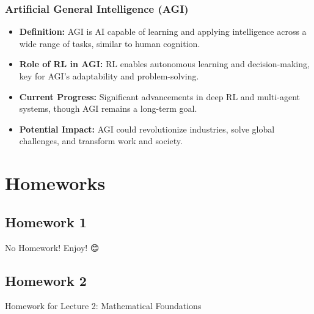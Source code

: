 \documentclass[
  letterpaper,
  DIV=11,
  numbers=noendperiod]{scrreprt}
\begin{document}
\section{Artificial General Intelligence
(AGI)}\label{artificial-general-intelligence-agi}

\begin{itemize}
\item
  \textbf{Definition:} AGI is AI capable of learning and applying
  intelligence across a wide range of tasks, similar to human cognition.
\item
  \textbf{Role of RL in AGI:} RL enables autonomous learning and
  decision-making, key for AGI's adaptability and problem-solving.
\item
  \textbf{Current Progress:} Significant advancements in deep RL and
  multi-agent systems, though AGI remains a long-term goal.
\item
  \textbf{Potential Impact:} AGI could revolutionize industries, solve
  global challenges, and transform work and society.
\end{itemize}

\part{Homeworks}

\chapter{Homework 1}\label{homework-1}

\begin{tcolorbox}[enhanced jigsaw, arc=.35mm, toprule=.15mm, leftrule=.75mm, colback=white, left=2mm, colframe=quarto-callout-note-color-frame, rightrule=.15mm, opacityback=0, breakable, bottomrule=.15mm]

No Homework! Enjoy! 😊

\end{tcolorbox}

\chapter{Homework 2}\label{homework-2}

\begin{tcolorbox}[enhanced jigsaw, arc=.35mm, toprule=.15mm, leftrule=.75mm, colback=white, left=2mm, colframe=quarto-callout-note-color-frame, rightrule=.15mm, opacityback=0, breakable, bottomrule=.15mm]

Homework for Lecture 2: Mathematical Foundations 📝

\end{tcolorbox}
\end{document}
